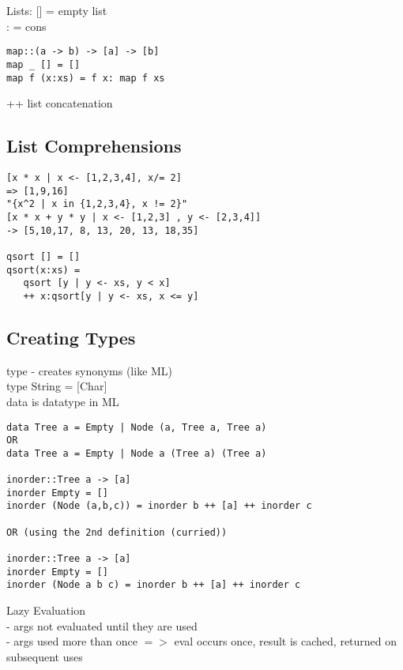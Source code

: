 \documentclass[11pt]{article}
\begin{document}
Lists: [] = empty list \\

: = cons

\begin{verbatim}
map::(a -> b) -> [a] -> [b]
map _ [] = []
map f (x:xs) = f x: map f xs
\end{verbatim}

++ list concatenation \\

\subsection{List Comprehensions}

\begin{verbatim}
[x * x | x <- [1,2,3,4], x/= 2]
=> [1,9,16]
"{x^2 | x in {1,2,3,4}, x != 2}"
[x * x + y * y | x <- [1,2,3] , y <- [2,3,4]]
-> [5,10,17, 8, 13, 20, 13, 18,35] 

qsort [] = []
qsort(x:xs) = 
   qsort [y | y <- xs, y < x]
   ++ x:qsort[y | y <- xs, x <= y]
\end{verbatim}

\subsection{Creating Types}

type - creates synonyms (like ML) \\

type String = [Char] \\

data is datatype in ML \\

\begin{verbatim}
data Tree a = Empty | Node (a, Tree a, Tree a)
OR
data Tree a = Empty | Node a (Tree a) (Tree a)

inorder::Tree a -> [a]
inorder Empty = []
inorder (Node (a,b,c)) = inorder b ++ [a] ++ inorder c

OR (using the 2nd definition (curried))

inorder::Tree a -> [a]
inorder Empty = []
inorder (Node a b c) = inorder b ++ [a] ++ inorder c
\end{verbatim}

Lazy Evaluation \\

- args not evaluated until they are used \\

- args used more than once $=>$ eval occurs once, result is cached, returned on subsequent uses \\ 
\end{document}
